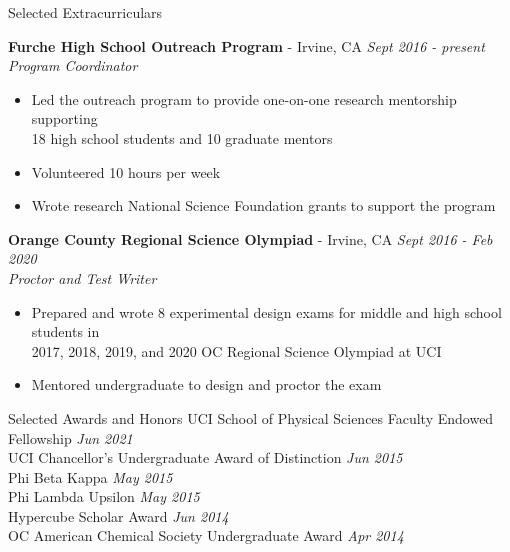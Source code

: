 \documentclass{resume} %
\begin{document}
\begin{rSection}{Selected Extracurriculars}

  {\bf Furche High School Outreach Program} - Irvine, CA \hfill {\em Sept 2016 - present} \\
  {\textit{Program Coordinator}}
  \vspace{-0.5em}
  \begin{itemize}
  \itemsep-0.75em
  \item Led the outreach program to provide one-on-one research mentorship supporting\\
    18 high school students and 10 graduate mentors
  \item Volunteered 10 hours per week
  \item Wrote research National Science Foundation grants to support the program  %
  \end{itemize}

  {\bf Orange County Regional Science Olympiad} - Irvine, CA \hfill {\em Sept 2016 - Feb 2020}  \\
  {\textit{Proctor and Test Writer}}
  \vspace{-0.5em}
  \begin{itemize}
  \itemsep-0.75em
  \item Prepared and wrote 8 experimental design exams for middle and high school students in\\
    2017, 2018, 2019, and 2020 OC Regional Science Olympiad at UCI
  \item Mentored undergraduate to design and proctor the exam
  \end{itemize}

\end{rSection}

\begin{rSection}{Selected Awards and Honors}
  UCI School of Physical Sciences Faculty Endowed Fellowship \hfill {\em Jun 2021} \\
  UCI Chancellor's Undergraduate Award of Distinction \hfill {\em Jun 2015} \\
  Phi Beta Kappa \hfill {\em May 2015} \\
  Phi Lambda Upsilon \hfill {\em May 2015} \\
  Hypercube Scholar Award \hfill {\em Jun 2014} \\
  OC American Chemical Society Undergraduate Award \hfill {\em Apr 2014}
\end{rSection}
\end{document}
